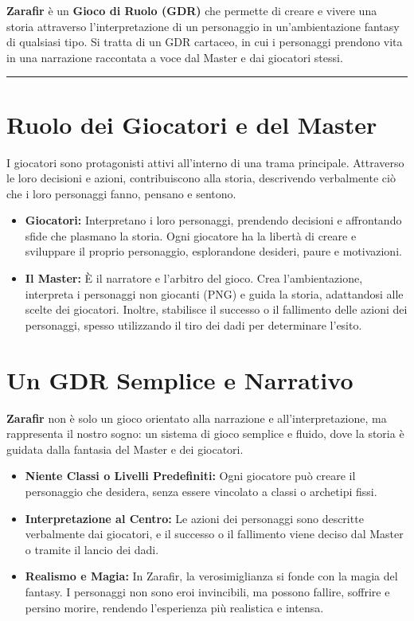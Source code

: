 \documentclass[../manuale_main.tex]{subfiles}
\begin{document}
\textbf{Zarafir} è un \textbf{Gioco di Ruolo (GDR)} che permette di creare e vivere una storia attraverso l’interpretazione di un personaggio in un’ambientazione fantasy di qualsiasi tipo. Si tratta di un GDR cartaceo, in cui i personaggi prendono vita in una narrazione raccontata a voce dal Master e dai giocatori stessi.
\vspace{0.5cm}
\noindent
\begin{center}
\rule{\textwidth}{0.4pt} 
\end{center}
\vspace{0.5cm}

\section*{Ruolo dei Giocatori e del Master}
I giocatori sono protagonisti attivi all’interno di una trama principale. Attraverso le loro decisioni e azioni, contribuiscono alla storia, descrivendo verbalmente ciò che i loro personaggi fanno, pensano e sentono. 

\begin{itemize}
\item \textbf{Giocatori:} Interpretano i loro personaggi, prendendo decisioni e affrontando sfide che plasmano la storia. Ogni giocatore ha la libertà di creare e sviluppare il proprio personaggio, esplorandone desideri, paure e motivazioni.
\item \textbf{Il Master:} È il narratore e l’arbitro del gioco. Crea l’ambientazione, interpreta i personaggi non giocanti (PNG) e guida la storia, adattandosi alle scelte dei giocatori. Inoltre, stabilisce il successo o il fallimento delle azioni dei personaggi, spesso utilizzando il tiro dei dadi per determinare l'esito.
\end{itemize}

\vspace{0.3cm}

\section*{Un GDR Semplice e Narrativo}
\textbf{Zarafir} non è solo un gioco orientato alla narrazione e all’interpretazione, ma rappresenta il nostro sogno: un sistema di gioco semplice e fluido, dove la storia è guidata dalla fantasia del Master e dei giocatori. 

\begin{itemize}
\item \textbf{Niente Classi o Livelli Predefiniti:} Ogni giocatore può creare il personaggio che desidera, senza essere vincolato a classi o archetipi fissi.
\item \textbf{Interpretazione al Centro:} Le azioni dei personaggi sono descritte verbalmente dai giocatori, e il successo o il fallimento viene deciso dal Master o tramite il lancio dei dadi.
\item \textbf{Realismo e Magia:} In Zarafir, la verosimiglianza si fonde con la magia del fantasy. I personaggi non sono eroi invincibili, ma possono fallire, soffrire e persino morire, rendendo l’esperienza più realistica e intensa.
\end{itemize}
\end{document}
